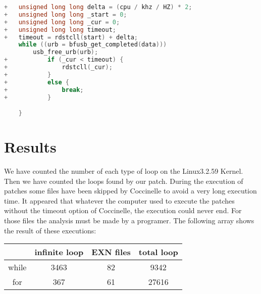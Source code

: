 \documentclass[11pt]{article}
\begin{document}
\vspace*{5mm}

\lstset{numbers=left,firstnumber=1,numberfirstline=true}
\begin{lstlisting}[language=C]
+	unsigned long long delta = (cpu / khz / HZ) * 2;
+	unsigned long long _start = 0;
+	unsigned long long _cur = 0;
+	unsigned long long timeout;
+	timeout = rdstcll(start) + delta;
	while ((urb = bfusb_get_completed(data)))
		usb_free_urb(urb);
+			if (_cur < timeout) {
+				rdstcll(_cur);
+			}
+			else {
+				break;
+			}

 	}

\end{lstlisting}

\section{Results}
We have counted the number of each type of loop on the Linux3.2.59 Kernel. Then we have counted the loops found by our patch. During the execution of patches some files have been skipped by Coccinelle to avoid a very long execution time. It appeared that whatever the computer used to execute the patches without the timeout option of Coccinelle, the execution could never end. For those files the analysis must be made by a programer. The following array shows the result of these executions:

\vspace*{5mm}
\begin{tabular}{|c|c|c|c|}
  \hline
    & infinite loop & EXN files & total loop \\
  \hline
  while &  3463  & 82 & 9342 \\
  \hline
  for  & 367 & 61 &  27616 \\
  \hline
\end{tabular} 
\vspace*{5mm}
\end{document}
